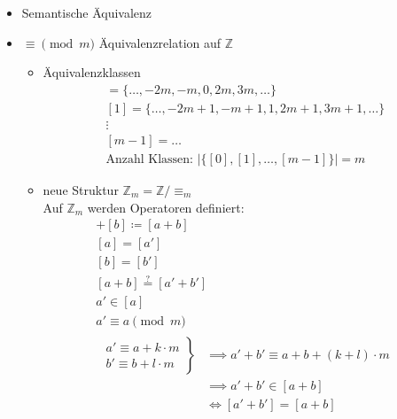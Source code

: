 \begin{bsp*}
	\begin{itemize}
		\item Semantische Äquivalenz
		\item $\equiv \pmod m$ Äquivalenzrelation auf $\mathbb{Z}$
		\begin{itemize}
			\item Äquivalenzklassen\\
			\begin{gather*}
				[0] = \{ \dotsc, -2m, -m, 0, 2m, 3m, \dotsc \} \\
				[1] = \{ \dotsc, -2m+1, -m+1, 1, 2m+1, 3m+1, \dotsc \} \\
				\vdots \\
				[m-1] = \dots \\
				\text{Anzahl Klassen: } | \{[0], [1], \dotsc , [m-1] \} | = m
			\end{gather*}
			\item neue Struktur $\mathbb{Z}_m = \mathbb{Z}/\equiv_m$ \\
				Auf $\mathbb{Z}_m$ werden Operatoren definiert:\\
				\begin{gather*}
					[a] + [b] \coloneqq [a+b] \\
					[a] = [a'] \\
					[b] = [b'] \\
					[a+b] \stackrel{?}{=} [a'+b'] \\
					a' \in [a] \\
					a' \equiv a \pmod m \\
					\begin{aligned}
						\left.\begin{array}{l}
							a' \equiv a + k \cdot m \\
							b' \equiv b + l \cdot m
						\end{array} \right\} &\implies a' + b' \equiv a + b + (k+l ) \cdot m \\
						&\implies a' + b' \in [a+b] \\
						&\iff [a'+b'] = [a+b]
					\end{aligned}
				\end{gather*}
		\end{itemize}
	\end{itemize}
\end{bsp*}

